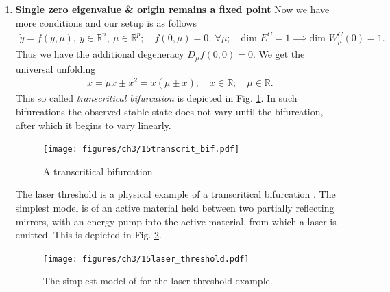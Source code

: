 \begin{enumerate}
\begin{remark}[]
		\end{remark}
		
	\item \textbf{Single zero eigenvalue \& origin remains a fixed point} 	
		Now we have more conditions and our setup is as follows
		\begin{align}
			\dot{y} = f(y, \mu),\ y \in \mathbb{R}^{n},\ \mu\in \mathbb{R}^{p};\quad f(0,\mu )=0,\ \forall \mu ;\quad  \textrm{dim }E^{C}=1\implies  \textrm{dim } W^{C}_{\mu }(0)=1.  
		\end{align}
		Thus we have the additional degeneracy $D_{\mu }f(0,0)=0$. We get the universal unfolding 
		\begin{align}
			\dot{x} = \tilde{\mu }x \pm x^2 = x (\tilde{\mu } \pm x);\quad x \in \mathbb{R};\quad \tilde{\mu} \in \mathbb{R}.	
		\end{align}
		This so called \emph{transcritical bifurcation} is depicted in Fig. \ref{fig:transcrit_bif}. In such bifurcations the observed stable state does not vary until the bifurcation, after which it begins to vary linearly.
		\begin{figure}[h!]
			\centering
			\texttt{[image: figures/ch3/15transcrit\_bif.pdf]}
			\caption{A transcritical bifurcation.}
			\label{fig:transcrit_bif}
		\end{figure}
	\begin{ex}
		The laser threshold is a physical example of a transcritical bifurcation \cite{Strogatz, Haken1977}. The simplest model is of an active material held between two partially reflecting mirrors, with an energy pump into the active material, from which a laser is emitted. This is depicted in Fig. \ref{fig:laser_model}.
		\begin{figure}[h!]
			\centering
			\texttt{[image: figures/ch3/15laser\_threshold.pdf]}
		\caption{The simplest model of for the laser threshold example.} %
			\label{fig:laser_model}
		\end{figure}
	

\end{ex}
\end{enumerate}
